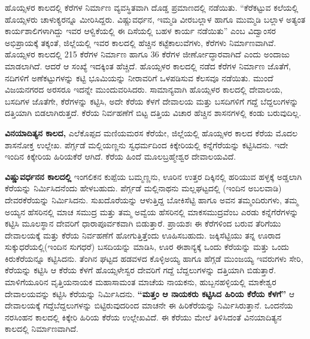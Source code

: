 ಹೊಯ್ಸಳರ ಕಾಲದಲ್ಲಿ ಕೆರೆಗಳ ನಿರ್ಮಾಣ ವ್ಯವಸ್ಥಿತವಾಗಿ ದೊಡ್ಡ ಪ್ರಮಾಣದಲ್ಲಿ ನಡೆಯಿತು. “ಕೆರೆಕಟ್ಟುವ ಕಲೆಯಲ್ಲಿ ಹೊಯ್ಸಳರು ಚಾಳುಕ್ಯರನ್ನೂ ಮೀರಿಸಿದ್ದರು. ವಿಷ್ಣುವರ್ಧನ, ಇಮ್ಮಡಿ ವೀರಬಲ್ಲಾಳ ಹಾಗೂ ಮುಮ್ಮಡಿ ಬಲ್ಲಾಳ ಅತ್ಯಂತ ಕಾರ್ಯಶಾಲಿಗಳಾಗಿದ್ದು ಇವರ ಆಳ್ವಿಕೆಯಲ್ಲಿ ಈ ದಿಸೆಯಲ್ಲಿ ಬಹಳ ಕಾರ್ಯ ನಡೆಯಿತು” ಎಂಬ ವಿದ್ವಾಂಸರ ಅಭಿಪ್ರಾಯಕ್ಕೆ ತಕ್ಕಂತೆ, ಜಿಲ್ಲೆಯಲ್ಲಿ ಇವರ ಕಾಲದಲ್ಲಿ ಹೆಚ್ಚಿನ ಕಟ್ಟೆಕಾಲುವೆಗಳು, ಕೆರೆಗಳು ನಿರ್ಮಾಣವಾಗಿವೆ. ಹೊಯ್ಸಳರ ಕಾಲದಲ್ಲಿ 215 ಕೆರೆಗಳ ನಿರ್ಮಾಣ ಹಾಗೂ 36 ಕೆರೆಗಳ ಜೀರ್ಣೋದ್ಧಾರವಾಗಿದೆ ಎಂದು ಅಂದಾಜು ಮಾಡಲಾಗಿದೆ. ಆದರೆ ಆ ಸಂಖ್ಯೆ ಇದಕ್ಕಿಂತ ಹೆಚ್ಚಿದೆ. ಹೊಯ್ಸಳರ ಕಾಲದಲ್ಲಿ ನಡೆದ ಕೆರೆಗಳ ನಿರ್ಮಾಣ ಜೊತೆಗೆ, ನದಿಗಳಿಗೆ ಅಣೆಕಟ್ಟುಗಳನ್ನು ಕಟ್ಟಿ ಭೂಮಿಯನ್ನು ನೀರಾವರಿಗೆ ಒಳಪಡಿಸುವ ಕೆಲಸವೂ ನಡೆಯಿತು. ಮುಂದೆ ವಿಜಯನಗರದ ಅರಸರೂ ಇದನ್ನೇ ಮುಂದುವರಿಸಿದರು. ಸಾಮಾನ್ಯವಾಗಿ ಹೊಯ್ಸಳರ ಕಾಲದಲ್ಲಿ ದೇವಾಲಯ, ಬಸದಿಗಳ ಜೊತೆಗೇ, ಕೆರೆಗಳನ್ನು ಕಟ್ಟಿಸಿ, ಅದೇ ಕೆರೆಯ ಕೆಳಗೆ ದೇವಾಲಯ ಮತ್ತು ಬಸದಿಗಳಿಗೆ ಗದ್ದೆ ಬೆದ್ದಲುಗಳನ್ನು ದತ್ತಿಯಾಗಿ ಬಿಡಲಾಗಿರುತ್ತದೆ. ಕೆರೆಯ ನಿರ್ವಹಣೆಗೆ ಬಿಟ್ಟ ದತ್ತಿಯ ವಿಚಾರ ಹೆಚ್ಚಿನ ಶಾಸನಗಳಲ್ಲಿ ಕಂಡು ಬರುವುದಿಲ್ಲ.

\textbf{ವಿನಯಾದಿತ್ಯನ ಕಾಲದ,} ಎಲೆಕೊಪ್ಪದ ಮಣಿಯಮರಸ ಕೆರೆಯೇ, ಜಿಲ್ಲೆಯಲ್ಲಿ ಹೊಯ್ಸಳರ ಕಾಲದ ಕೆರೆಯ ಮೊದಲ ಶಾಸನೋಕ್ತ ಉಲ್ಲೇಖ. ಪೆರ್ಗ್ಗಡೆ ಮಲ್ಲಿಯಣ್ಣನು ಸ್ವಧರ್ಮದಿಂದ ಕಿಕ್ಕೇರಿಯಲ್ಲಿ ಕನ್ನೆಗೆರೆಯನ್ನು ಕಟ್ಟಿಸಿದನು. ಇದೇ ಇಂದಿನ ಕಿಕ್ಕೇರಿಯ ಹಿರಿಯಕೆರೆ ಆಗಿದೆ. ಕೆರೆಯ ಹಿಂದೆ ಮೂಲಬ್ರಹ್ಮೇಶ್ವರ ದೇವಾಲಯವಿದೆ.

\textbf{ವಿಷ್ಣುವರ್ಧನನ ಕಾಲದಲ್ಲಿ} ಇಂಗಲಿಕನ ಕುಪ್ಪೆಯ ಬಮ್ಮಣ್ಣನು, ಊರಿನ ಉತ್ತರ ದಿಕ್ಕಿನಲ್ಲಿ ಹರಿಯುವ ಹಳ್ಳಕ್ಕೆ ಅಡ್ಡಲಾಗಿ ಕೆರೆಯನ್ನು ನಿರ್ಮಿಸಿದನೆಂದು ಹೇಳಬಹುದು. ಪೆರ್ಗ್ಗಡೆ ಮಲ್ಲಿನಾಥನು ಮಲ್ಲಘಟ್ಟದಲ್ಲಿ (ಇಂದಿನ ಅಬಲವಾಡಿ) ದೇವರಕೆರೆಯನ್ನು ನಿರ್ಮಿಸಿದನು. ಸುಖದೊರೆಯನ್ನು ಆಳುತ್ತಿದ್ದ ಬೋಕಿಸೆಟ್ಟಿ ಹಾಗೂ ಅವನ ತಮ್ಮಂದಿರುಗಳು, ತಮ್ಮ ಅಯ್ಯನ ಹೆಸರಿನಲ್ಲಿ ಮಾಚ ಸಮುದ್ರ ಮತ್ತು ತಮ್ಮ ಅವ್ವೆಯ ಹೆಸರಿನಲ್ಲಿ ಮಾಕಸಮುದ್ರವೆಂಬ ಎರಡು ಕನ್ನೆಗೆರೆಗಳನ್ನು ಕಟ್ಟಿಸಿ ಮೂಲಸ್ಥಾನ ದೇವರಿಗೆ ಧಾರಾಪೂರ್ವಕವಾಗಿ ಬಿಡುತ್ತಾರೆ. ಪ್ರಾಯಶಃ ಈ ಕೆರೆಗಳಿಂದ ಬರುವ ತೆರಿಗೆಯು ದೇವಾಲಯಕ್ಕೆ ಮತ್ತು ಕೆರೆಯ ನಿರ್ವಹಣೆಗೆ ಹೋಗುತ್ತಿತ್ತೆಂದು ಊಹಿಸಬಹುದು. ಜಕ್ಕಿಸೆಟ್ಟಿಯು ತನ್ನ ಊರಾದ ಸುಕ್ಕುಧರೆಯಲ್ಲಿ(ಇಂದಿನ ಸುಗಧರೆ) ಬಸದಿಯನ್ನು ಮಾಡಿಸಿ, ಊರ ಈಶಾನ್ಯಕ್ಕೆ ಒಂದು ಕೆರೆಯನ್ನು ಮತ್ತು ಒಂದು ಕಿರುಕೆರೆಯನ್ನೂ ಕಟ್ಟಿಸಿದನು. ತೆಂಗಿನ ಘಟ್ಟದ ಹಡವಳದ ಕೊಳ್ಳಿಅಯ್ಯ ಹಾಗೂ ಹೆಗ್ಗಡೆ ಮುಂಜಯ್ಯ ಇವರುಗಳು ಸೇರಿ, ಕೆರೆಯನ್ನು ಕಟ್ಟಿಸಿ ಆ ಕೆರೆಯ ಕೆಳಗೆ ಹೊಯ್ಸಳೇಸ್ವರ ದೇವರಿಗೆ ಗದ್ದೆ ಬೆದ್ದಲುಗಳನ್ನು ದತ್ತಿಯಾಗಿ ಬಿಡುತ್ತಾರೆ. ಮಾಳಿಗೆಯೂರಿನ ವೃತ್ತಿಯನಾಯಕ ಮಹಾಸಾಮಂತ ಮಾಚೆಯ ನಾಯಕನು, ಹುಬ್ಬನಹಳ್ಳಿಯಲ್ಲಿ ಮಾಕೇಶ್ವರ ದೇವಾಲಯವನ್ನು ಕಟ್ಟಿಸಿ ಕೆರೆಯನ್ನು ನಿರ್ಮಿಸಿದನು. \textbf{“ಮತ್ತಂ ಆ ನಾಯಕರು ಕಟ್ಟಿಸಿದ ಹಿರಿಯ ಕೆರೆಯ ಕೆಳಗೆ”} ಆ ದೇವಾಲಯಕ್ಕೆ ಗದ್ದೆಬೆದ್ದಲುಗಳನ್ನು ಬಿಟ್ಟಿರುವುದರಿಂದ ಮಾಚನೇ ಈ ಹಿರಿಕೆರೆಯನ್ನು ನಿರ್ಮಿಸಿರುತ್ತಾನೆ. ಒಂದನೆಯ ನರಸಿಂಹನ ಕಾಲದಲ್ಲಿ ಕಿಕ್ಕೇರಿ ಹಿರಿಯ ಕೆರೆಯ ಉಲ್ಲೇಖವಿದೆ. ಈ ಕೆರೆಯು ಮೇಲೆ ತಿಳಿಸಿದಂತೆ ವಿನಯಾದಿತ್ಯನ ಕಾಲದಲ್ಲಿ ನಿರ್ಮಾಣವಾಗಿದೆ.

